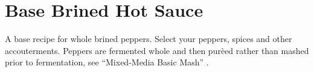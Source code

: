 \section[Brined Hot Sauce]{Base Brined Hot Sauce}
\label{base_lacto_brine_hotsauce}

\begin{recipestats}[
	servings=12 \fluidounce,
	preptime=60 minutes,
	bakingtime=2 weeks,
	source=\citefield{fieryferments2017}{title} \cite{fieryferments2017}; \textit{Pickl-It},
	]
\end{recipestats}

\begin{recipeabstract}
	A base recipe for whole brined peppers.
	Select your peppers, spices and other accouterments.
	Peppers are fermented whole and then pur\`{e}ed rather than mashed prior to fermentation, see ``Mixed-Media Basic Mash'' \cite{fieryferments2017}.
\end{recipeabstract}

\begin{ingredientcolumns}[1]
	\begin{ingredientblock}
		\\
		\\
		\\
		\\
		\\
		\\
		\\
		\\
	\end{ingredientblock}
\end{ingredientcolumns}

